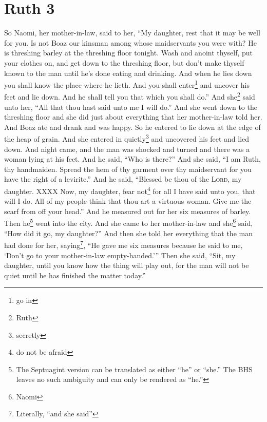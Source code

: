 \section{Ruth 3}\label{Ruth 3}
\begin{enumerate}[align=center]
     So Naomi, her mother-in-law, said to her, ``My daughter, rest that it may be well for you.%
     Is not Boaz our kinsman among whose maidservants you were with? He is threshing barley at the threshing floor tonight.%
     Wash and anoint thyself, put your clothes on, and get down to the threshing floor, but don't make thyself known to the man until he's done eating and drinking.%
     And when he lies down you shall know the place where he lieth. And you shall enter\footnote{go in} and uncover his feet and lie down. And he shall tell you that which you shall do.''%
     And she\footnote{Ruth} said unto her, ``All that thou hast said unto me I will do.''%
     And she went down to the threshing floor and she did just about everything that her mother-in-law told her.%
     And Boaz ate and drank and was happy. So he entered to lie down at the edge of the heap of grain. And she entered in quietly\footnote{secretly} and uncovered his feet and lied down.%
     And night came, and the man was shocked and turned and there was a woman lying at his feet.%
     And he said, ``Who is there?'' And she said, ``I am Ruth, thy handmaiden. Spread the hem of thy garment over thy maidservant for you have the right of a levirite.''%
     And he said, ``Blessed be thou of the \textsc{Lord}, my daughter. XXXX%
     Now, my daughter, fear not\footnote{do not be afraid} for all I have said unto you, that will I do. All of my people think that thou art a virtuous woman.%
     Give me the scarf from off your head.'' And he measured out for her six measures of barley. Then he\footnote{The Septuagint version can be translated as either ``he'' or ``she.'' The BHS leaves no such ambiguity and can only be rendered as ``he.''} went into the city.%
     And she came to her mother-in-law and she\footnote{Naomi} said, ``How did it go, my daughter?'' And then she told her everything that the man had done for her,%
     saying\footnote{Literally, ``and she said''}, ``He gave me six measures because he said to me, `Don't go to your mother-in-law empty-handed.'''%
     Then she said, ``Sit, my daughter, until you know how the thing will play out, for the man will not be quiet until he has finished the matter today.''%
\end{enumerate}
